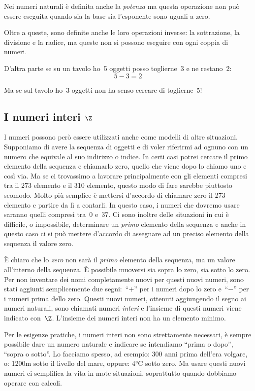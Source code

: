 Nei numeri naturali è definita anche la \emph{potenza} ma questa operazione 
non può essere eseguita quando sia la base sia l'esponente sono uguali a zero.

Oltre a queste, sono definite anche le loro operazioni inverse: la 
sottrazione, la divisione e la radice, ma queste non si possono eseguire
con ogni coppia di numeri.

D'altra parte se su un tavolo ho~5 oggetti posso toglierne~3 e ne restano~2:
\[5-3=2\]

Ma se sul tavolo ho~3 oggetti non ha senso cercare di toglierne~5!

\subsection{I numeri interi \(\Z\)}
\label{subsec:insnum_interi}

I numeri possono però essere utilizzati anche come modelli di altre 
situazioni. 
Supponiamo di avere la sequenza di oggetti e di voler riferirmi ad ognuno 
con un numero che equivale al suo indirizzo o indice. In certi casi potrei 
cercare il primo elemento della sequenza e chiamarlo zero, quello che viene 
dopo lo chiamo uno e così via. Ma se ci trovassimo a lavorare principalmente 
con gli elementi compresi tra il 273 elemento e il 310 elemento, questo 
modo di fare sarebbe piuttosto scomodo. 
Molto più semplice è mettersi d'accordo di chiamare zero il 273 elemento e 
partire da lì a contarli. In questo caso, i numeri che dovremo usare saranno 
quelli compresi tra~0 e~37. 
Ci sono inoltre delle situazioni in cui è difficile, o impossibile, 
determinare un \emph{primo} elemento della sequenza e anche in questo caso 
ci si può mettere d'accordo di assegnare ad un preciso elemento della 
sequenza il valore zero.

È chiaro che lo \emph{zero} non sarà il \emph{primo} elemento della 
sequenza, ma un valore all'interno della sequenza. 
È possibile muoversi sia sopra lo zero, sia sotto lo zero.
Per non inventare dei nomi completamente nuovi per questi nuovi 
numeri, sono stati aggiunti semplicemente due segni:~``\(+\)'' per i numeri 
dopo lo zero e~``\(-\)'' per i numeri prima dello zero. 
Questi nuovi numeri, ottenuti aggiungendo il segno ai numeri naturali, sono 
chiamati numeri \emph{interi} 
e l'insieme di questi numeri viene indicato con~\(\Z\).
L'insieme dei numeri interi non ha un elemento minimo.

Per le esigenze pratiche, i numeri interi non sono strettamente necessari, è 
sempre possibile dare un numero naturale e indicare se intendiamo ``prima o 
dopo'', ``sopra o sotto''. Lo facciamo spesso, ad esempio: 300 anni prima 
dell'era volgare, o: 1200m sotto il livello del mare, oppure: 4°C sotto zero. 
Ma usare questi nuovi numeri ci semplifica la vita in mote situazioni, 
soprattutto quando dobbiamo operare con calcoli.

